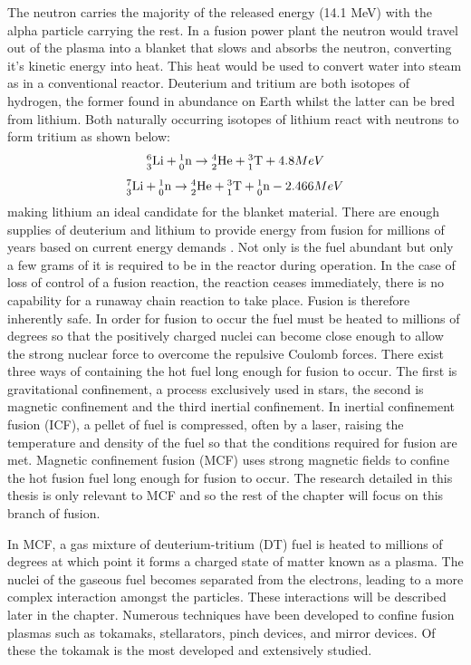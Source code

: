 	
	The neutron carries the majority of the released energy (14.1 MeV) with the alpha particle carrying the rest. In a fusion power plant the neutron would travel out of the plasma into a blanket that slows and absorbs the neutron, converting it's kinetic energy into heat. This heat would be used to convert water into steam as in a conventional reactor.
	Deuterium and tritium are both isotopes of hydrogen, the former found in abundance on Earth whilst the latter can be bred from lithium. Both naturally occurring isotopes of lithium react with neutrons to form tritium as shown below: 
\begin{equation}
	\nucl{6}{3}{Li} + \nucl{1}{0}{n} \to  \nucl{4}{2}{He} + \nucl{3}{1}{T}  +4.8MeV
\end{equation}
\begin{equation}
	\nucl{7}{3}{Li} + \nucl{1}{0}{n} \to  \nucl{4}{2}{He} + \nucl{3}{1}{T} + \nucl{1}{0}{n} -2.466MeV
\end{equation}
making lithium an ideal candidate for the blanket material.  There are enough supplies of deuterium and lithium to provide energy from fusion for millions of years based on current energy demands \cite{fusion_fuel}. Not only is the fuel abundant but only a few grams of it is required to be in the reactor during operation. In the case of loss of  control of a fusion reaction, the reaction ceases immediately, there is no capability for a runaway chain reaction to take place. Fusion is therefore inherently safe. 
	In order for fusion to occur the fuel must be heated to millions of degrees so that the positively charged nuclei can become close enough to allow the strong nuclear force to overcome the repulsive Coulomb forces. There exist three ways of containing the hot fuel long enough for fusion to occur. The first is gravitational confinement, a process exclusively used in stars, the second is magnetic confinement and the third inertial confinement. In inertial confinement fusion (ICF), a pellet of fuel is compressed, often by a laser, raising the temperature and density of the fuel so that the conditions required for fusion are met. Magnetic confinement fusion (MCF) uses strong magnetic fields to confine the hot fusion fuel long enough for fusion to occur. The research detailed in this thesis is only relevant to MCF and so the rest of the chapter will focus on this branch of fusion.
	
	In MCF, a gas mixture of deuterium-tritium (DT) fuel is heated to millions of degrees at which point it forms a charged state of matter known as a plasma. The nuclei of the gaseous fuel becomes separated from the electrons, leading to a more complex interaction amongst the particles. These interactions will be described later in the chapter. Numerous techniques have been developed to confine fusion plasmas such as tokamaks, stellarators, pinch devices, and mirror devices. Of these the tokamak is the most developed and extensively studied.
	
